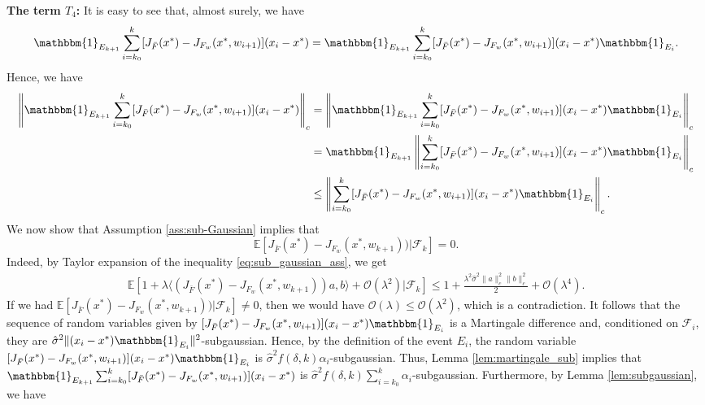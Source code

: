 \documentclass[letterpaper, 10 pt]{article}
\newcommand{\E}{\mathbb{E}}
\begin{document}
\textbf{The term $T_4$:}
It is easy to see that, almost surely, we have
\[ \mathbbm{1}_{E_{k+1}}\sum\limits_{i=k_0}^{k} [J_{\bar{F}}(x^*)-J_{F_w}(x^*,w_{i+1})](x_i-x^*) = \mathbbm{1}_{E_{k+1}}\sum\limits_{i=k_0}^{k} [J_{\bar{F}}(x^*)-J_{F_w}(x^*,w_{i+1})](x_i-x^*)\mathbbm{1}_{E_{i}}. \]
Hence, we have
\begin{align*}
    \left\| \mathbbm{1}_{E_{k+1}} \sum\limits_{i=k_0}^{k} [J_{\bar{F}}(x^*)-J_{F_w}(x^*,w_{i+1})](x_i-x^*) \right\|_c  &= \left\|\mathbbm{1}_{E_{k+1}}\sum\limits_{i=k_0}^{k} [J_{\bar{F}}(x^*)-J_{F_w}(x^*,w_{i+1})](x_i-x^*)\mathbbm{1}_{E_{i}}\right\|_c\\
    &= \mathbbm{1}_{E_{k+1}} \left\|\sum\limits_{i=k_0}^{k} [J_{\bar{F}}(x^*)-J_{F_w}(x^*,w_{i+1})](x_i-x^*)\mathbbm{1}_{E_{i}}\right\|_c\\
    &\leq \left\|\sum\limits_{i=k_0}^{k} [J_{\bar{F}}(x^*)-J_{F_w}(x^*,w_{i+1})](x_i-x^*)\mathbbm{1}_{E_{i}}\right\|_c.
\end{align*}
We now show that Assumption \ref{ass:sub-Gaussian} implies that
\[ \E[J_{\bar{F}}(x^*)-J_{F_w}(x^*,w_{k+1}))|\mathcal{F}_k]=0. \]
Indeed, by Taylor expansion of the inequality \eqref{eq:sub_gaussian_ass}, we get
\begin{align*}
    \E[1+ \lambda \langle( J_{\bar{F}}(x^*)-J_{F_{w}}(x^*, w_{k+1}))a, b\rangle + \mathcal{O}(\lambda^2)|\mathcal{F}_k]\leq 1+ \frac{\lambda^2\hat{\sigma}^2\|a\|^2_{c}\|b\|^2_{c}}{2} + \mathcal{O}(\lambda^4).
\end{align*}
If we had $\E[J_{\bar{F}}(x^*)-J_{F_w}(x^*,w_{k+1}))|\mathcal{F}_k]\neq 0$, then we would have $\mathcal{O}(\lambda)\leq \mathcal{O}(\lambda^2)$, which is a contradiction. It follows that the sequence of random variables given by $[J_{\bar{F}}(x^*)-J_{F_w}(x^*,w_{i+1})](x_i-x^*)\mathbbm{1}_{E_{i}}$ is a Martingale difference and, conditioned on $\mathcal{F}_i$, they are $\hat{\sigma}^2\|(x_i-x^*)\mathbbm{1}_{E_{i}}\|^2$-subgaussian.  Hence, by the definition of the event $E_i$, the random variable $[J_{\bar{F}}(x^*)-J_{F_w}(x^*,w_{i+1})](x_i-x^*)\mathbbm{1}_{E_{i}}$ is $\hat{\sigma}^2f(\delta,k)\alpha_i$-subgaussian. Thus, Lemma \ref{lem:martingale_sub} implies that $\mathbbm{1}_{E_{k+1}} \sum_{i=k_0}^{k} [J_{\bar{F}}(x^*)-J_{F_w}(x^*,w_{i+1})](x_i-x^*)$ is $\hat{\sigma}^2f(\delta,k)\sum_{i=k_0}^k\alpha_i$-subgaussian. Furthermore, by Lemma \ref{lem:subgaussian}, we have
\end{document}
